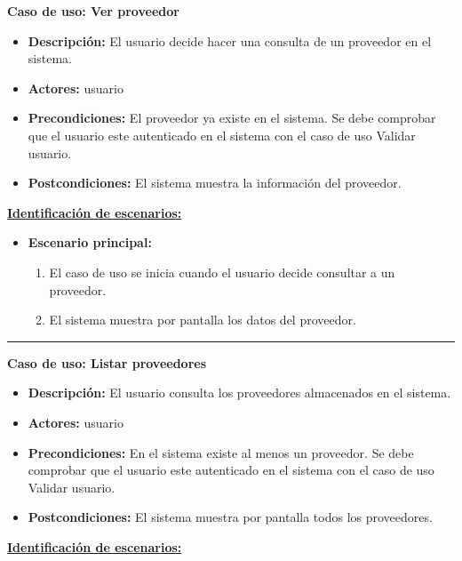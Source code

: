 \textbf{Caso de uso: Ver proveedor}
\begin{itemize}\renewcommand{\labelitemi}{$\cdot$}
 \item \textbf{Descripción:} El usuario decide hacer una consulta de un proveedor en el sistema.
  \item \textbf{Actores:} usuario
  \item \textbf{Precondiciones:} El proveedor ya existe en el sistema. Se debe comprobar que el usuario este autenticado en el sistema con el caso de uso Validar usuario.
  \item \textbf{Postcondiciones:} El sistema muestra la información del proveedor.
\end{itemize}
\underline{\textbf{Identificación de escenarios:}}
\begin{itemize}\renewcommand{\labelitemi}{$\circ$}
 \item \textbf{Escenario principal:}
         \begin{enumerate}
          \item El caso de uso se inicia cuando el usuario decide consultar a un proveedor.
	  \item El sistema muestra por pantalla los datos del proveedor.
         \end{enumerate}
\end{itemize}
\smallskip
\hrule height 1pt
\smallskip
\textbf{Caso de uso: Listar proveedores}
\begin{itemize}\renewcommand{\labelitemi}{$\cdot$}
 \item \textbf{Descripción:} El usuario consulta los proveedores almacenados en el sistema.
  \item \textbf{Actores:} usuario
  \item \textbf{Precondiciones:} En el sistema existe al menos un proveedor. Se debe comprobar que el usuario este autenticado en el sistema con el caso de uso Validar usuario.
  \item \textbf{Postcondiciones:} El sistema muestra por pantalla todos los proveedores.
\end{itemize}
\underline{\textbf{Identificación de escenarios:}}
